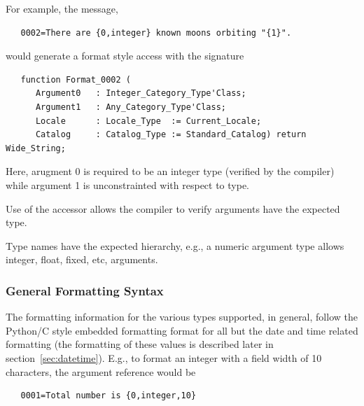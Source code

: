 For example, the message,
\begin{xmpl}
\begin{verbatim}
   0002=There are {0,integer} known moons orbiting "{1}".
\end{verbatim}
\end{xmpl}
would generate a format style access with the signature
\begin{xmpl}
\begin{verbatim}
   function Format_0002 (
      Argument0   : Integer_Category_Type'Class;
      Argument1   : Any_Category_Type'Class;
      Locale      : Locale_Type  := Current_Locale;
      Catalog     : Catalog_Type := Standard_Catalog) return Wide_String;
\end{verbatim}
\end{xmpl}
Here, arugment 0 is required to be an integer type (verified by the compiler)
while argument 1 is unconstrainted with respect to type.

Use of the accessor allows the compiler to verify arguments have the expected
type.

Type names have the expected hierarchy, e.g., a numeric argument type allows
integer, float, fixed, etc, arguments.

\subsubsection{General Formatting Syntax}

The formatting information for the various types supported, in general,
follow the Python/C style embedded formatting format for all but the date
and time related formatting (the formatting of these values is described
later in section~\ref{sec:datetime}).  E.g., to format an integer with a
field width of 10 characters, the argument reference would be
\begin{small}
\begin{verbatim}
   0001=Total number is {0,integer,10}
\end{verbatim}
\end{small}

